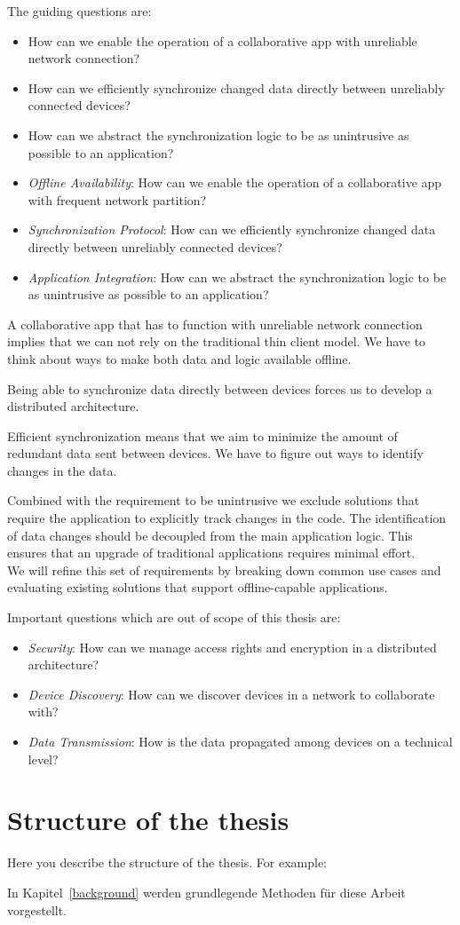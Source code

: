 The guiding questions are:
\begin{itemize}
\item How can we enable the operation of a collaborative app with unreliable network connection?
\item How can we efficiently synchronize changed data directly between unreliably connected devices?
\item How can we abstract the synchronization logic to be as unintrusive as possible to an application?\\
\item \emph{Offline Availability}: How can we enable the operation of a collaborative app with frequent network partition?
\item \emph{Synchronization Protocol}: How can we efficiently synchronize changed data directly between unreliably connected devices?
\item \emph{Application Integration}: How can we abstract the synchronization logic to be as unintrusive as possible to an application?\\
\end{itemize}

A collaborative app that has to function with unreliable network connection implies that we can not rely on the traditional thin client model. We have to think about ways to make both data and logic available offline.

Being able to synchronize data directly between devices forces us to develop a distributed architecture.

Efficient synchronization means that we aim to minimize the amount of redundant data sent between devices. We have to figure out ways to identify changes in the data.

Combined with the requirement to be unintrusive we exclude solutions that require the application to explicitly track changes in the code. The identification of data changes should be decoupled from the main application logic. This ensures that an upgrade of traditional applications requires minimal effort.\\

We will refine this set of requirements by breaking down common use cases and evaluating existing solutions that support offline-capable applications.

Important questions which are out of scope of this thesis are:

\begin{itemize}
\item \emph{Security}: How can we manage access rights and encryption in a distributed architecture?
\item \emph{Device Discovery}: How can we discover devices in a network to collaborate with?
\item \emph{Data Transmission}: How is the data propagated among devices on a technical level?
\end{itemize}

\section{Structure of the thesis}
Here you describe the structure of the thesis. For example:

In Kapitel~\ref{background} werden grundlegende Methoden für diese Arbeit vorgestellt.